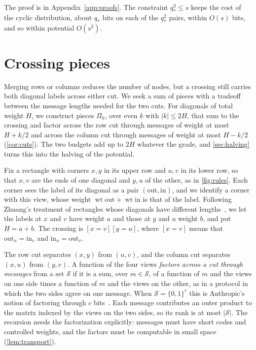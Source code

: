 \documentclass[11pt]{article}
\theoremstyle{definition}
\theoremstyle{definition}
\theoremstyle{remark}
\newcommand{\wt}{\operatorname{wt}}
\newcommand{\out}{\mathrm{out}}
\newcommand{\inn}{\mathrm{in}}
\begin{document}
The proof is in Appendix~\ref{app:proofs}. The constraint $q_*^3\le s$ keeps the cost of the cyclic distribution, about $q_*$ bits on each of the $q_*^2$ pairs, within $O(s)$ bits, and so within potential $O(s^2)$.

\section{Crossing pieces}\label{sec:pieces}

Merging rows or columns reduces the number of nodes, but a crossing still carries both diagonal labels across either cut. We seek a sum of pieces with a tradeoff between the message lengths needed for the two cuts. For diagonals of total weight $H$, we construct pieces $\Pi_k$, over even $k$ with $|k|\le2H$, that sum to the crossing and factor across the row cut through messages of weight at most $H+k/2$ and across the column cut through messages of weight at most $H-k/2$ (\cref{cor:cuts}). The two budgets add up to $2H$ whatever the grade, and \cref{sec:halving} turns this into the halving of the potential.

Fix a rectangle with corners $x,y$ in its upper row and $u,v$ in its lower row, so that $x,v$ are the ends of one diagonal and $y,u$ of the other, as in \cref{fig:rules}. Each corner sees the label of its diagonal as a pair $(\out,\inn)$, and we identify a corner with this view, whose weight $\wt\out+\wt\inn$ is that of the label. Following Zhuang's treatment of rectangles whose diagonals have different lengths~\cite[\S\S3--4]{Zhu26}, we let the labels at $x$ and $v$ have weight $a$ and those at $y$ and $u$ weight $b$, and put $H=a+b$. The crossing is $[x=v][y=u]$, where $[x=v]$ means that $\out_x=\inn_v$ and $\inn_x=\out_v$.

The row cut separates $(x,y)$ from $(u,v)$, and the column cut separates $(x,u)$ from $(y,v)$. A function of the four views \emph{factors across a cut through messages} from a set $\mathcal S$ if it is a sum, over $m\in\mathcal S$, of a function of $m$ and the views on one side times a function of $m$ and the views on the other, as in a protocol in which the two sides agree on one message. When $\mathcal S=\{0,1\}^c$ this is Anthropic's notion of factoring through $c$ bits~\cite{Ant26}. Each message contributes an outer product to the matrix indexed by the views on the two sides, so its rank is at most $|\mathcal S|$. The recursion needs the factorization explicitly: messages must have short codes and controlled weights, and the factors must be computable in small space (\cref{lem:transport}).
\end{document}
